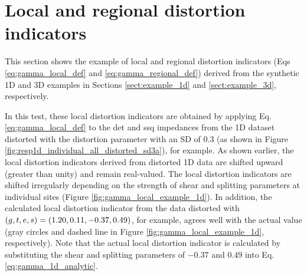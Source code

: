 
\renewcommand{\thisdir}{_content/gamma}
\renewcommand{\figdir}{\thisdir/_fig}
\section{Local and regional distortion indicators}

This section shows the example of local and regional distortion indicators (Eqs \ref{eq:gamma_local_def} and \ref{eq:gamma_regional_def}) derived from the synthetic 1D and 3D examples in Sections \ref{sect:example_1d} and \ref{sect:example_3d}, respectively.


	In this test, these local distortion indicators are obtained by applying Eq. \eqref{eq:gamma_local_def} to the det and ssq impedances from the 1D dataset distorted with the distortion parameter with an SD of 0.3 (as shown in Figure \ref{fig:resp1d_individual_all_distorted_sd3a}), for example.
	As shown earlier, the local distortion indicators derived from distorted 1D data are shifted upward (greater than unity) and remain real-valued.
	The local distortion indicators are shifted irregularly depending on the strength of shear and splitting parameters at individual sites (Figure \ref{fig:gamma_local_example_1d}). 
	In addition, the calculated local distortion indicator from the data distorted with $(g,t,e,s) = (1.20,0.11,-0.37,0.49)$, for example, agrees well with the actual value (gray circles and dashed line in Figure \ref{fig:gamma_local_example_1d}, respectively).
	Note that the actual local distortion indicator is calculated by substituting the shear and splitting parameters of $-0.37$ and 0.49 into Eq. \eqref{eq:gamma_1d_analytic}.

